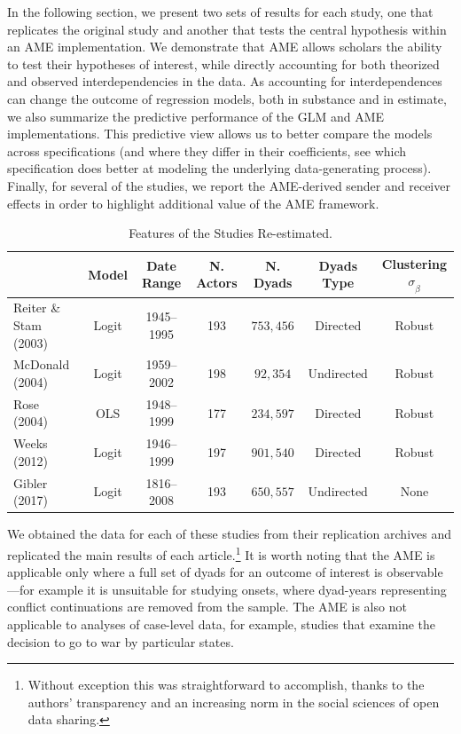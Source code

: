 \documentclass{article}[12pt]
\begin{document}
In the following section, we present two sets of results for each
study, one that replicates the original study and another that tests
the central hypothesis within an AME implementation. We demonstrate
that AME allows scholars the ability to test their hypotheses of
interest, while directly accounting for both theorized and observed interdependencies in the
data. As accounting for interdependences can change the outcome
of regression models, both in substance and in estimate, we also summarize the
predictive performance of the GLM and AME implementations. This
predictive view allows us to better compare the models across
specifications (and where they differ in their coefficients, see which specification does better at modeling the underlying data-generating process). Finally, for several of the studies, we report the
AME-derived sender and receiver effects in order to highlight
additional value of the AME framework.


\begin{table}
\caption{Features of the Studies Re-estimated.}
	\begin{tabular}{lcccccc}
		& Model &  Date Range & N. Actors  & N. Dyads & Dyads Type & Clustering $\sigma_{\hat{\beta}}$ \\ \toprule
		Reiter \& Stam (2003) &Logit &1945--1995 &  193 & $753,456$ & Directed & Robust \\	
		McDonald (2004) & Logit &1959--2002 & 198 & $92,354$ & Undirected & Robust\\
		Rose (2004) & OLS & 1948--1999 & 177 & $234,597$ & Directed & Robust \\	 
		Weeks (2012) & Logit & 1946--1999 &197 &  $901,540$ & Directed & Robust \\
		Gibler (2017) & Logit & 1816--2008 &193 &   $650,557$ & Undirected & None \\ \bottomrule
	\end{tabular}
\end{table}

We obtained the data for each of these studies from their replication
archives and replicated the main results of each
article.\footnote{Without exception this was straightforward to
  accomplish, thanks to the authors' transparency  and an increasing norm in the social sciences of
  open data sharing.}  It is worth noting that the AME is applicable
only where a full set of dyads for an outcome of interest is
observable---for example it is unsuitable for studying onsets, where
dyad-years representing conflict continuations are removed from the
sample. The AME is also not applicable to analyses of case-level data,
for example, studies that examine the decision to go to war by
particular states.
\end{document}
